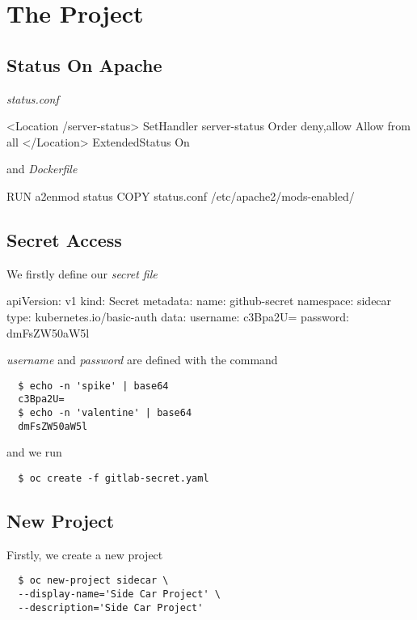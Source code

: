 \section{The Project}

\subsection{Status On Apache}

\emph{status.conf}
\begin{apachecode*}{}
  <Location /server-status>
  SetHandler server-status
  Order deny,allow
  Allow from all
  </Location> ExtendedStatus On
\end{apachecode*}

and  \emph{Dockerfile}

\begin{dockercode*}{}
  RUN a2enmod status
  COPY status.conf /etc/apache2/mods-enabled/
\end{dockercode*}

\subsection{Secret Access}

We firstly define our \emph{secret file}

\begin{yamlcode*}{}
  apiVersion: v1
  kind: Secret
  metadata:
    name: github-secret
    namespace: sidecar
  type: kubernetes.io/basic-auth
  data:
    username: c3Bpa2U=
    password: dmFsZW50aW5l
\end{yamlcode*}

\emph{username} and \emph{password} are defined with the command

\begin{verbatim}
  $ echo -n 'spike' | base64
  c3Bpa2U=
  $ echo -n 'valentine' | base64
  dmFsZW50aW5l
\end{verbatim}

and we run

\begin{verbatim}
  $ oc create -f gitlab-secret.yaml
\end{verbatim}

\subsection{New Project}

Firstly, we create a new project

\begin{verbatim}
  $ oc new-project sidecar \
  --display-name='Side Car Project' \
  --description='Side Car Project'
\end{verbatim}

